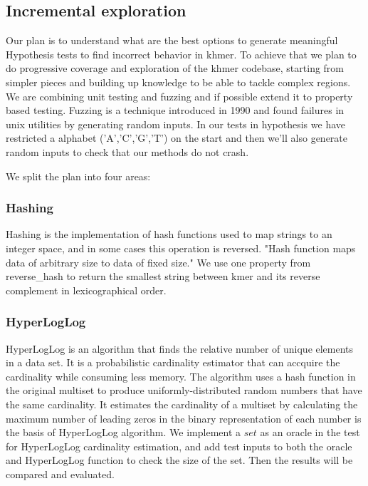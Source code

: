 \documentclass[preprint,nocopyrightspace]{sig-alternate}
\begin{document}
\subsection{Incremental exploration}
Our plan is to understand what are the best options to generate meaningful Hypothesis tests to find incorrect behavior in khmer.
To achieve that we plan to do progressive coverage and exploration of the khmer codebase,
starting from simpler pieces and building up knowledge to be able to tackle complex regions.
We are combining unit testing and fuzzing and if possible extend it to property based testing.
Fuzzing \citet{qi2013research} is a technique introduced in 1990 and found failures in unix utilities by generating random inputs.
In our tests in hypothesis we have restricted a alphabet ('A','C','G','T') on the start and then we'll also  
generate random inputs to check that our methods do not crash.

We split the plan into four areas:

\subsubsection{Hashing}
Hashing is the implementation of hash functions used to map strings to an integer space,
and in some cases this operation is reversed.
"Hash function maps data of arbitrary size to data of fixed size."\citet{hash}
We use one property from reverse\_hash to return the smallest string between kmer and its reverse complement in lexicographical order.

\subsubsection{HyperLogLog}
HyperLogLog is an algorithm that finds the relative number of unique elements in a data set.
It is a probabilistic cardinality estimator that can accquire the cardinality while consuming less memory.
The algorithm uses a hash function in the original multiset to produce uniformly-distributed random numbers that have the same cardinality.\cite{hyperloglog_2012}
It estimates the cardinality of a multiset by calculating the maximum number of leading zeros in the binary representation of each number is the basis of HyperLogLog algorithm.\citet{hyperloglog_2007}
We implement a $set$ as an oracle in the test for HyperLogLog cardinality estimation,
and add test inputs to both the oracle and HyperLogLog function to check the size of the set.
Then the results will be compared and evaluated. 
\end{document}
